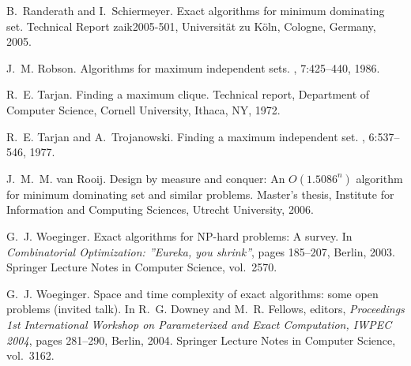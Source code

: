 \documentclass[fleqn]{stacs_proc}
\begin{document}
\begin{thebibliography}{10}
B.~Randerath and I.~Schiermeyer.
\newblock Exact algorithms for minimum dominating set.
\newblock Technical Report zaik2005-501, Universit\"{a}t zu K\"{o}ln, Cologne,
  Germany, 2005.

J.~M. Robson.
\newblock Algorithms for maximum independent sets.
, 7:425--440, 1986.

R.~E. Tarjan.
\newblock Finding a maximum clique.
\newblock Technical report, Department of Computer Science, Cornell University,
  Ithaca, NY, 1972.

R.~E. Tarjan and A.~Trojanowski.
\newblock Finding a maximum independent set.
, 6:537--546, 1977.

J.~M.~M. {van Rooij}.
\newblock Design by measure and conquer: An {$O(1.5086^n)$} algorithm for
  minimum dominating set and similar problems.
\newblock Master's thesis, Institute for Information and Computing Sciences,
  Utrecht University, 2006.

G.~J. Woeginger.
\newblock Exact algorithms for {NP}-hard problems: {A} survey.
\newblock In {\em Combinatorial Optimization: ''Eureka, you shrink''}, pages
  185--207, Berlin, 2003. Springer Lecture Notes in Computer Science,
  vol.~2570.

G.~J. Woeginger.
\newblock Space and time complexity of exact algorithms: some open problems
  (invited talk).
\newblock In R.~G. Downey and M.~R. Fellows, editors, {\em Proceedings 1st
  International Workshop on Parameterized and Exact Computation, IWPEC 2004},
  pages 281--290, Berlin, 2004. Springer Lecture Notes in Computer Science,
  vol.~3162.

\end{thebibliography}

\newpage
\null
\end{document}
